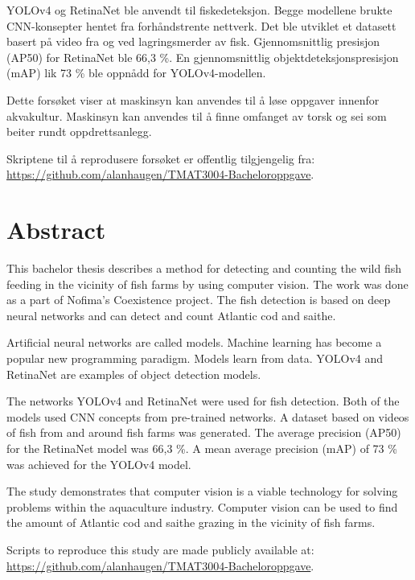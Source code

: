 YOLOv4 og RetinaNet ble anvendt til fiskedeteksjon. Begge modellene brukte CNN-konsepter hentet fra forhåndstrente nettverk. Det ble utviklet et datasett basert på video fra og ved lagringsmerder av fisk. Gjennomsnittlig presisjon (AP50) for RetinaNet ble 66,3 \%. En gjennomsnittlig objektdeteksjonspresisjon (mAP) lik 73 \% ble oppnådd for YOLOv4-modellen.

Dette forsøket viser at maskinsyn kan anvendes til å løse oppgaver innenfor akvakultur. Maskinsyn kan anvendes til å finne omfanget av torsk og sei som beiter rundt oppdrettsanlegg.%

Skriptene til å reprodusere forsøket er offentlig tilgjengelig fra: \\ \url{https://github.com/alanhaugen/TMAT3004-Bacheloroppgave}.

\section*{Abstract}

This bachelor thesis describes a method for detecting and counting the wild fish feeding in the vicinity of fish farms by using computer vision. The work was done as a part of Nofima's Coexistence project. The fish detection is based on deep neural networks and can detect and count Atlantic cod and saithe.

Artificial neural networks are called models. Machine learning has become a popular new programming paradigm. Models learn from data. YOLOv4 and RetinaNet are examples of object detection models.

The networks YOLOv4 and RetinaNet were used for fish detection. Both of the models used CNN concepts from pre-trained networks. A dataset based on videos of fish from and around fish farms was generated. The average precision (AP50) for the RetinaNet model was 66,3 \%. A mean average precision (mAP) of 73 \% was achieved for the YOLOv4 model.

The study demonstrates that computer vision is a viable technology for solving problems within the aquaculture industry. Computer vision can be used to find the amount of Atlantic cod and saithe grazing in the vicinity of fish farms.

Scripts to reproduce this study are made publicly available at: \\ \url{https://github.com/alanhaugen/TMAT3004-Bacheloroppgave}.

